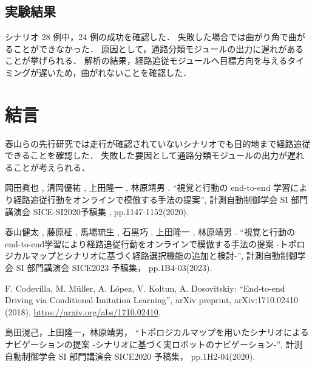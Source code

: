 \documentclass[10pt]{jarticle}
\begin{document}
    \subsection{実験結果}
    シナリオ 28 例中，24 例の成功を確認した．
    失敗した場合では曲がり角で曲がることができなかった．
    原因として，通路分類モジュールの出力に遅れがあることが挙げられる．
    解析の結果，経路追従モジュールへ目標方向を与えるタイミングが遅いため，曲がれないことを確認した．

    \section{結\hspace{2zw}言}%
    春山らの先行研究では走行が確認されていないシナリオでも目的地まで経路追従できることを確認した．
    失敗した要因として通路分類モジュールの出力が遅れることが考えられる．

    \vspace{5truemm}
    {\footnotesize
        \begin{thebibliography}{99}
            
            岡田眞也 , 清岡優祐 , 上田隆一 , 林原靖男 .
            ``視覚と行動の end-to-end 学習により経路追従行動をオンラインで模倣する手法の提案'',
            計測自動制御学会 SI 部門講演会 SICE-SI2020予稿集 , 
            pp.1147-1152(2020).

            春山健太 , 藤原柾 , 馬場琉生 , 石黒巧 , 上田隆一 , 林原靖男 .
            ``視覚と行動のend-to-end学習により経路追従行動をオンラインで模倣する手法の提案 -トポロジカルマップとシナリオに基づく経路選択機能の追加と検討-'',
            計測自動制御学会 SI 部門講演会 SICE2023 予稿集，
            pp.1B4-03(2023).
       
            F. Codevilla, M. Müller, A. López, V. Koltun, A. Dosovitskiy: 
            ``End-to-end Driving via Conditional Imitation Learning'', 
            arXiv preprint, arXiv:1710.02410 (2018), 
            \url{https://arxiv.org/abs/1710.02410}.

            島田滉己，上田隆一，林原靖男，
            ``トポロジカルマップを用いたシナリオによるナビゲーションの提案 -シナリオに基づく実ロボットのナビゲーション-'',
            計測自動制御学会 SI 部門講演会 SICE2020 予稿集，
            pp.1H2-04(2020).



        \end{thebibliography}
    }
    \normalsize
    
\end{document}
